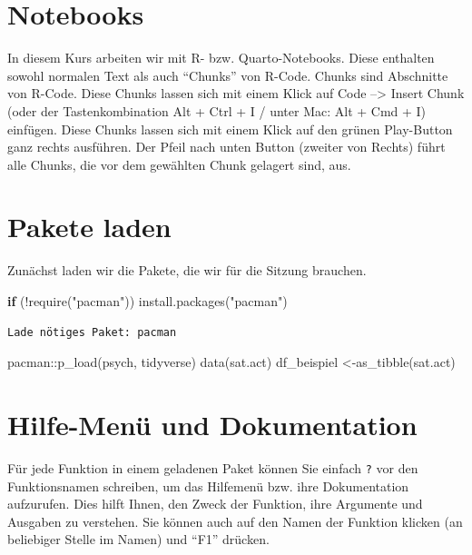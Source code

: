 \documentclass[
  letterpaper,
  DIV=11,
  numbers=noendperiod]{scrreprt}
\newenvironment{Shaded}{\begin{snugshade}}{\end{snugshade}}
\newcommand{\ControlFlowTok}[1]{\textcolor[rgb]{0.00,0.23,0.31}{\textbf{#1}}}
\newcommand{\FunctionTok}[1]{\textcolor[rgb]{0.28,0.35,0.67}{#1}}
\newcommand{\NormalTok}[1]{\textcolor[rgb]{0.00,0.23,0.31}{#1}}
\newcommand{\OtherTok}[1]{\textcolor[rgb]{0.00,0.23,0.31}{#1}}
\newcommand{\SpecialCharTok}[1]{\textcolor[rgb]{0.37,0.37,0.37}{#1}}
\newcommand{\StringTok}[1]{\textcolor[rgb]{0.13,0.47,0.30}{#1}}
\begin{document}
\section{Notebooks}\label{notebooks}

In diesem Kurs arbeiten wir mit R- bzw. Quarto-Notebooks. Diese
enthalten sowohl normalen Text als auch ``Chunks'' von R-Code. Chunks
sind Abschnitte von R-Code. Diese Chunks lassen sich mit einem Klick auf
Code --\textgreater{} Insert Chunk (oder der Tastenkombination Alt +
Ctrl + I / unter Mac: Alt + Cmd + I) einfügen. Diese Chunks lassen sich
mit einem Klick auf den grünen Play-Button ganz rechts ausführen. Der
Pfeil nach unten Button (zweiter von Rechts) führt alle Chunks, die vor
dem gewählten Chunk gelagert sind, aus.

\section{Pakete laden}\label{pakete-laden-1}

Zunächst laden wir die Pakete, die wir für die Sitzung brauchen.

\begin{Shaded}
\begin{Highlighting}[]
\ControlFlowTok{if}\NormalTok{ (}\SpecialCharTok{!}\FunctionTok{require}\NormalTok{(}\StringTok{"pacman"}\NormalTok{)) }\FunctionTok{install.packages}\NormalTok{(}\StringTok{"pacman"}\NormalTok{)}
\end{Highlighting}
\end{Shaded}

\begin{verbatim}
Lade nötiges Paket: pacman
\end{verbatim}

\begin{Shaded}
\begin{Highlighting}[]
\NormalTok{pacman}\SpecialCharTok{::}\FunctionTok{p\_load}\NormalTok{(psych, tidyverse)}
\FunctionTok{data}\NormalTok{(sat.act)}
\NormalTok{df\_beispiel }\OtherTok{\textless{}{-}}\FunctionTok{as\_tibble}\NormalTok{(sat.act)}
\end{Highlighting}
\end{Shaded}

\section{Hilfe-Menü und
Dokumentation}\label{hilfe-menuxfc-und-dokumentation}

Für jede Funktion in einem geladenen Paket können Sie einfach \texttt{?}
vor den Funktionsnamen schreiben, um das Hilfemenü bzw. ihre
Dokumentation aufzurufen. Dies hilft Ihnen, den Zweck der Funktion, ihre
Argumente und Ausgaben zu verstehen. Sie können auch auf den Namen der
Funktion klicken (an beliebiger Stelle im Namen) und ``F1'' drücken.
\end{document}
